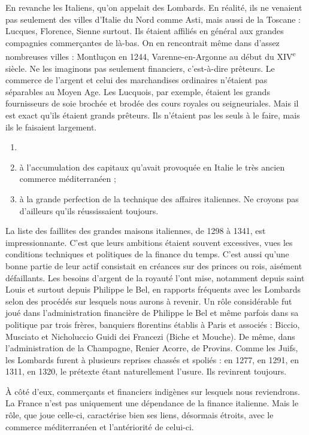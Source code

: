 \documentclass[french,twoside]{book} %
\begin{document}
En revanche les Italiens, qu’on appelait des Lombards. En réalité, ils ne venaient pas seulement des villes d’Italie du Nord comme Asti, mais aussi de la Toscane : Lucques, Florence, Sienne surtout. Ils étaient affiliés en général aux grandes compagnies commerçantes de là-bas. On en rencontrait même dans d’assez nombreuses villes : Montluçon en 1244, Varenne-en-Argonne au début du XIV\textsuperscript{e} siècle. Ne les imaginons pas seulement financiers, c’est-à-dire prêteurs. Le commerce de l’argent et celui des marchandises ordinaires n’étaient pas séparables au Moyen Age. Les Lucquois, par exemple, étaient les grands fournisseurs de soie brochée et brodée des cours royales ou seigneuriales. Mais il est exact qu’ils étaient  
\label{p89} grands prêteurs. Ils n’étaient pas les seuls à le faire, mais ils le faisaient largement.\par

\begin{enumerate}[itemsep=0pt,]
\item[] \hspace{-1.5em}{\bfseries Ils devaient l’importance de leur rôle :}
\item à l’accumulation des capitaux qu’avait provoquée en Italie le très ancien commerce méditerranéen ;
\item à la grande perfection de la technique des affaires italiennes. Ne croyons pas d’ailleurs qu’ils réussissaient toujours.

\end{enumerate}\noindent La liste des faillites des grandes maisons italiennes, de 1298 à 1341, est impressionnante. C’est que leurs ambitions étaient souvent excessives, vues les conditions techniques et politiques de la finance du temps. C’est aussi qu’une bonne partie de leur actif consistait en créances sur des princes ou rois, aisément défaillants. Les besoins d’argent de la royauté l’ont mise, notamment depuis saint Louis et surtout depuis Philippe le Bel, en rapports fréquents avec les {\term Lombards} selon des procédés sur lesquels nous aurons à revenir. Un rôle considérable fut joué dans l’administration financière de Philippe le Bel et même parfois dans sa politique par trois frères, banquiers florentins établis à Paris et associés : Biccio, Musciato et Nicholuccio Guidi dei Francezi (Biche et Mouche). De même, dans l’administration de la Champagne, Renier Acorre, de Provins. Comme les Juifs, les Lombards furent à plusieurs reprises chassés et spoliés : en 1277, en 1291, en 1311, en 1320, le prétexte étant naturellement l’usure. Ils revinrent toujours.\par
À côté d’eux, commerçants et financiers indigènes sur lesquels nous reviendrons. La France n’est pas uniquement une dépendance de la finance italienne. Mais le rôle, que joue celle-ci, caractérise bien ses liens, désormais étroits, avec le commerce méditerranéen et l’antériorité de celui-ci.
\end{document}
